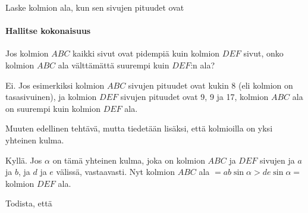 \begin{tehtavasivu}
\begin{tehtava}
Laske kolmion ala, kun sen sivujen pituudet ovat
\begin{alakohdat}
\end{alakohdat}
\begin{vastaus}
\begin{alakohdat}
\end{alakohdat}
\end{vastaus}
\end{tehtava}

\paragraph*{Hallitse kokonaisuus}

\begin{tehtava}
Jos kolmion $ABC$ kaikki sivut ovat pidempiä kuin kolmion $DEF$ sivut, onko kolmion $ABC$ ala välttämättä suurempi kuin $DEF$:n ala?
\begin{vastaus}
Ei. Jos esimerkiksi kolmion $ABC$ sivujen pituudet ovat kukin 8 (eli kolmion on tasasivuinen), ja kolmion $DEF$ sivujen pituudet ovat 9, 9 ja 17, kolmion $ABC$ ala on suurempi kuin kolmion $DEF$ ala.
\end{vastaus}
\end{tehtava}

\begin{tehtava}
Muuten edellinen tehtävä, mutta tiedetään lisäksi, että kolmioilla on yksi yhteinen kulma.
\begin{vastaus}
Kyllä. Jos $\alpha$ on tämä yhteinen kulma, joka on kolmion $ABC$ ja $DEF$ sivujen ja $a$ ja $b$, ja $d$ ja $e$ välissä, vastaavasti. Nyt kolmion $ABC$ ala $= ab \sin \alpha > de \sin \alpha =$ kolmion $DEF$ ala. 
\end{vastaus}
\end{tehtava}

\begin{tehtava}
Todista, että 
\begin{alakohdat}
\end{alakohdat}
\begin{vastaus}
\begin{alakohdat}
\end{alakohdat}
\end{vastaus}
\end{tehtava}


\end{tehtavasivu}
